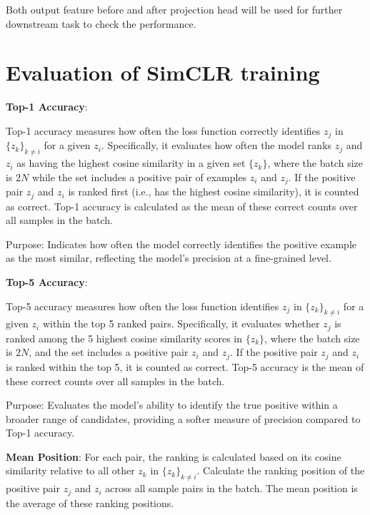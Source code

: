 Both output feature before and after projection head will be used for further downstream task to check the performance.

\section{Evaluation of SimCLR training} \label{sec:Evaluation result of SImclr}

\textbf{Top-1 Accuracy}:

Top-1 accuracy measures how often the loss function correctly identifies \( z_j \) in \( \{ z_k \}_{k \neq i} \) for a given \( z_i \). Specifically, it evaluates how often the model
 ranks \( z_j \) and \( z_i \) as having the highest cosine similarity in a given set \( \{ z_k \} \), where the batch size is \( 2N \) while the set includes a positive pair of 
 examples \( z_i \) and \( z_j \).  
If the positive pair \( z_j \) and \( z_i \) is ranked first (i.e., has the highest cosine similarity), it is counted as correct. Top-1 accuracy is calculated as the mean of these correct
 counts over all samples in the batch.  

Purpose: Indicates how often the model correctly identifies the positive example as the most similar, reflecting the model's precision at a fine-grained level.


\textbf{Top-5 Accuracy}:

Top-5 accuracy measures how often the loss function identifies \( z_j \) in \( \{ z_k \}_{k \neq i} \) for a given \( z_i \) within the top 5 ranked pairs. Specifically, it evaluates whether \( z_j \) is ranked among the 5 highest cosine similarity scores in \( \{ z_k \} \), where the batch size is \( 2N \), and the set includes a positive pair \( z_i \) and \( z_j \).  
If the positive pair \( z_j \) and \( z_i \) is ranked within the top 5, it is counted as correct. Top-5 accuracy is the mean of these correct counts over all samples in the batch.  

Purpose: Evaluates the model's ability to identify the true positive within a broader range of candidates, providing a softer measure of precision compared to Top-1 accuracy.

\textbf{Mean Position}: 
For each pair, the ranking is calculated based on its cosine similarity relative to all other \( z_k \) in \( \{ z_k \}_{k \neq i} \). Calculate the ranking position of the positive 
pair \( z_j \) and  \( z_i \) across all sample pairs in the batch. The mean position is the average of these ranking positions.

